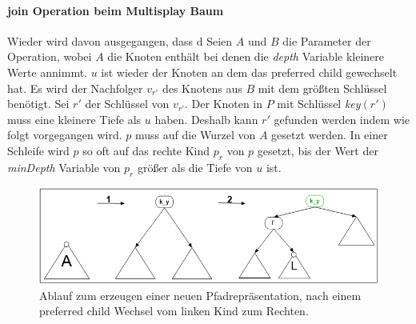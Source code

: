 \documentclass[a4paper,12pt]{article}
\begin{document}
\paragraph{join Operation beim Multisplay Baum}
Wieder wird davon ausgegangen, dass d
Seien $A$ und $B$ die Parameter der Operation, wobei $A$ die Knoten enthält bei denen die \textit{depth} Variable kleinere Werte annimmt. $u$ ist wieder der Knoten an dem das preferred child gewechselt hat.
 Es wird der  Nachfolger $v_{r'}$ des Knotens aus $B$ mit dem größten Schlüssel benötigt. Sei $r'$ der Schlüssel von $v_{r'}$. Der Knoten in $P$ mit Schlüssel \textit{key}$\left(r'\right)$ muss eine kleinere Tiefe als $u$ haben. Deshalb kann $r'$ gefunden werden indem  wie folgt vorgegangen wird. $p$ muss auf die Wurzel von $A$ gesetzt werden. In einer Schleife wird $p$ so oft auf das rechte Kind $p_r$ von $p$ gesetzt, bis der Wert der \textit{minDepth} Variable von $p_r$ größer als die Tiefe von $u$ ist.

\begin{figure}[h]
	\centering
	\includegraphics[width= 1\textwidth]{"Medien/Multisplay/split"}
	\caption {Ablauf zum erzeugen einer neuen Pfadrepräsentation, nach einem preferred child Wechsel vom linken Kind zum Rechten.}
	\label{fig:split}
\end{figure} 



\newpage


\end{document}
